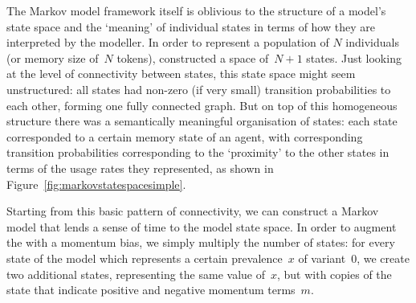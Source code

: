 The Markov model framework itself is oblivious to the structure of a model's state space and the `meaning' of individual states in terms of how they are interpreted by the modeller. In order to represent a population of $N$ individuals (or memory size of~$N$ tokens), \citeauthor{Reali2009} constructed a space of~$N+1$ states. Just looking at the level of connectivity between states, this state space might seem unstructured: all states had non-zero (if very small) transition probabilities to each other, forming one fully connected graph. But on top of this homogeneous structure there was a semantically meaningful organisation of states: each state corresponded to a certain memory state of an agent, with corresponding transition probabilities corresponding to the `proximity' to the other states in terms of the usage rates they represented, as shown in Figure~\ref{fig:markovstatespacesimple}.

Starting from this basic pattern of connectivity, we can construct a Markov model that lends a sense of time to the model state space.
In order to augment the with a momentum bias, we simply multiply the number of states: for every state of the \citeauthor{Reali2009} model which represents a certain prevalence~$x$ of variant~$0$, we create two additional states, representing the same value of~$x$, but with copies of the state that indicate positive and negative momentum terms~$m$.

